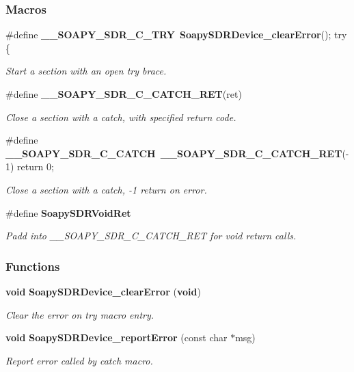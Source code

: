 \subsubsection*{Macros}
\begin{DoxyCompactItemize}
\item 
\#define {\bf \+\_\+\+\_\+\+S\+O\+A\+P\+Y\+\_\+\+S\+D\+R\+\_\+\+C\+\_\+\+T\+RY}~{\bf Soapy\+S\+D\+R\+Device\+\_\+clear\+Error}(); try \{
\begin{DoxyCompactList}\small\item\em Start a section with an open try brace. \end{DoxyCompactList}\item 
\#define {\bf \+\_\+\+\_\+\+S\+O\+A\+P\+Y\+\_\+\+S\+D\+R\+\_\+\+C\+\_\+\+C\+A\+T\+C\+H\+\_\+\+R\+ET}(ret)
\begin{DoxyCompactList}\small\item\em Close a section with a catch, with specified return code. \end{DoxyCompactList}\item 
\#define {\bf \+\_\+\+\_\+\+S\+O\+A\+P\+Y\+\_\+\+S\+D\+R\+\_\+\+C\+\_\+\+C\+A\+T\+CH}~{\bf \+\_\+\+\_\+\+S\+O\+A\+P\+Y\+\_\+\+S\+D\+R\+\_\+\+C\+\_\+\+C\+A\+T\+C\+H\+\_\+\+R\+ET}(-\/1) return 0;
\begin{DoxyCompactList}\small\item\em Close a section with a catch, -\/1 return on error. \end{DoxyCompactList}\item 
\#define {\bf Soapy\+S\+D\+R\+Void\+Ret}
\begin{DoxyCompactList}\small\item\em Padd into \+\_\+\+\_\+\+S\+O\+A\+P\+Y\+\_\+\+S\+D\+R\+\_\+\+C\+\_\+\+C\+A\+T\+C\+H\+\_\+\+R\+ET for void return calls. \end{DoxyCompactList}\end{DoxyCompactItemize}
\subsubsection*{Functions}
\begin{DoxyCompactItemize}
\item 
{\bf void} {\bf Soapy\+S\+D\+R\+Device\+\_\+clear\+Error} ({\bf void})
\begin{DoxyCompactList}\small\item\em Clear the error on try macro entry. \end{DoxyCompactList}\item 
{\bf void} {\bf Soapy\+S\+D\+R\+Device\+\_\+report\+Error} (const char $\ast$msg)
\begin{DoxyCompactList}\small\item\em Report error called by catch macro. \end{DoxyCompactList}\end{DoxyCompactItemize}


